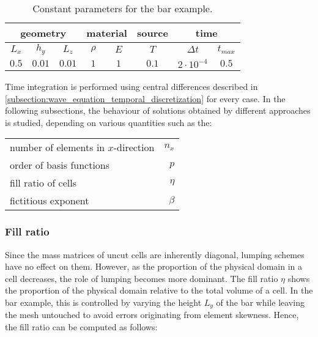 \begin{table}[h]
	\centering
	\bgroup
	\def\arraystretch{1.5}
	\begin{tabular}{|c|c|c|c|c|c|c|c|}
		\hline
		\multicolumn{3}{|c}{geometry} & \multicolumn{2}{|c}{material} & \multicolumn{1}{|c}{source} & \multicolumn{2}{|c|}{time} \\
		\hline \hline
		$L_x$ & $h_y$ & $L_z$ & $\rho$ & $E$ & $T$ & $\Delta t$ & $t_{max}$ \\
		\hline
		$0.5$ & $0.01$ & $0.01$ & $1$ & $1$ & $0.1$ & $2\cdot 10^{-4}$ & $0.5$ \\
		\hline
	\end{tabular}
	\egroup
	\caption{Constant parameters for the bar example.}
\end{table}

Time integration is performed using central differences described in \ref{subsection:wave_equation_temporal_discretization} for every case. In the following subsections, the behaviour of solutions obtained by different approaches is studied, depending on various quantities such as the:

\begin{tabular}{>{\textbullet\hspace{\labelsep}}lr}
	number of elements in $x$-direction & $n_x$ \\
	order of basis functions & $p$ \\
	fill ratio of cells & $\eta$ \\
	fictitious exponent & $\beta$
\end{tabular}\bigskip

\subsubsection*{Fill ratio}
\label{section:fill_ratio}

Since the mass matrices of uncut cells are inherently diagonal, lumping schemes have no effect on them. However, as the proportion of the physical domain in a cell decreases, the role of lumping becomes more dominant. The fill ratio $\eta$ shows the proportion of the physical domain relative to the total volume of a cell. In the bar example, this is controlled by varying the height $L_y$ of the bar while leaving the mesh untouched to avoid errors originating from element skewness. Hence, the fill ratio can be computed as follows:

